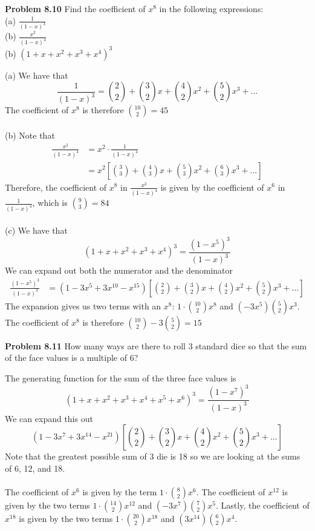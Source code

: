 \documentclass[11pt]{scrartcl}
\begin{document}
\begin{tcolorbox}
\textbf{Problem 8.10} Find the coefficient of $x^8$ in the following expressions:\\
(a) $\frac{1}{(1-x)^3}$\\
(b) $\frac{x^2}{(1-x)^4}$\\
(b) $(1+x+x^2+x^3+x^4)^3$
\end{tcolorbox}
\noindent 
(a) We have that 
$$\frac{1}{(1-x)^3}={2 \choose 2}+{3 \choose 2}x+{4 \choose 2}x^2+{5 \choose 2}x^3+...$$
The coefficient of $x^8$ is therefore ${10 \choose 2}=45$\\
\\
\noindent
(b) Note that 
\begin{align*}
\frac{x^2}{(1-x)^4} &=x^2 \cdot \frac{1}{(1-x)^4} \\
                    &=x^2 \left[{3 \choose 3}+{4 \choose 3}x+{5 \choose 3}x^2+{6 \choose 3}x^3+...\right]
\end{align*}
Therefore, the coefficient of $x^8$ in $\frac{x^2}{(1-x)^4}$ is given by the coefficient of $x^6$ in $\frac{1}{(1-x)^4}$, which is ${9 \choose 3}=84$ \\
\\
\noindent 
(c) We have that 
$$(1+x+x^2+x^3+x^4)^3=\frac{(1-x^5)^3}{(1-x)^3}$$
We can expand out both the numerator and the denominator 
\begin{align*}
    \frac{(1-x^5)^3}{(1-x)^3} &=(1-3x^5+3x^{10}-x^{15})\left[{2 \choose 2}+{3 \choose 2}x+{4 \choose 2}x^2+{5 \choose 2}x^3+...\right]
\end{align*}
The expansion gives us two terms with an $x^8$: $ 1 \cdot {10 \choose 2}x^8$ and $(-3x^5){5 \choose 2}x^3$. The coefficient of $x^8$ is therefore ${10 \choose 2}-3{5 \choose 2}=15$
\begin{tcolorbox}
\textbf{Problem 8.11}  How many ways are there to roll 3 standard dice so that the sum of the face values is a multiple of 6?
\end{tcolorbox}
\noindent 
The generating function for the sum of the three face values is 
$$(1+x+x^2+x^3+x^4+x^5+x^6)^3=\frac{(1-x^7)^3}{(1-x)^3}$$
We can expand this out
$$(1-3x^7+3x^{14}-x^{21})\left[{2 \choose 2}+{3 \choose 2}x+{4 \choose 2}x^2+{5 \choose 2}x^3+...\right]$$
Note that the greatest possible sum of 3 die is 18 so we are looking at the sums of 6, 12, and 18. \\
\\
\noindent 
The coefficient of $x^6$ is given by the term $1 \cdot {8 \choose 2}x^6$. The coefficient of $x^{12}$ is given by the two terms $1 \cdot {14 \choose 2}x^{12}$ and $(-3x^7){7 \choose 2}x^5$. Lastly, the coefficient of $x^{18}$ is given by the two terms $1 \cdot {20 \choose 2}x^{18}$ and $(3x^{14}){6 \choose 2}x^4$. \\
\end{document}

